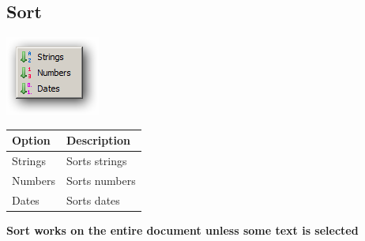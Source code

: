 \hypertarget{menu_tools_sort}{}
\subsection{Sort}

\includegraphics[scale=0.50]{./res/menu_tools_sort.png}\\

\begin{scriptsize}\begin{tabularx}{\textwidth}{>{\hsize=0.3\hsize}X>{\hsize=0.7\hsize}X}\\
    \hline
    \textbf{Option} & \textbf{Description} \\
    \hline
    Strings & Sorts strings \\
    Numbers & Sorts numbers \\
    Dates & Sorts dates \\
    \hline
  \end{tabularx}\end{scriptsize}

\textbf{Sort works on the entire document unless some text is selected}
